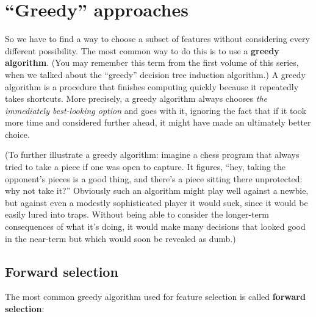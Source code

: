 \section{``Greedy'' approaches}


So we have to find a way to choose a subset of features without considering
every different possibility. The most common way to do this is to use a
\textbf{greedy algorithm}. (You may remember this term from the first volume of
this series, when we talked about the ``greedy'' decision tree induction
algorithm.) A greedy algorithm is a procedure that finishes computing quickly
because it repeatedly takes shortcuts. More precisely, a greedy algorithm
always chooses \textit{the immediately best-looking option} and goes with it,
ignoring the fact that if it took more time and considered further ahead, it
might have made an ultimately better choice.

(To further illustrate a greedy algorithm: imagine a chess program that always
tried to take a piece if one was open to capture. It figures, ``hey, taking
the opponent's pieces is a good thing, and there's a piece sitting there
unprotected: why not take it?'' Obviously such an algorithm might play well
against a newbie, but against even a modestly sophisticated player it would
suck, since it would be easily lured into traps. Without being able to
consider the longer-term consequences of what it's doing, it would make many
decisions that looked good in the near-term but which would soon be revealed
as dumb.)

\subsection{Forward selection}


The most common greedy algorithm used for feature selection is called
\textbf{forward selection}:


